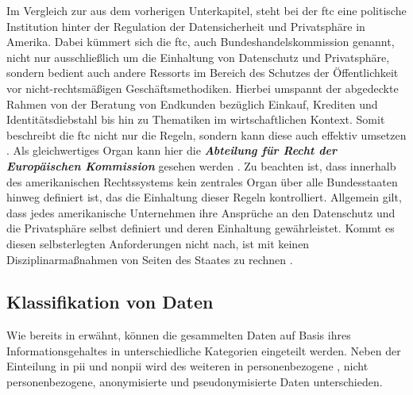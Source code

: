 Im Vergleich zur  aus dem vorherigen Unterkapitel, steht bei der \acl{ftc} eine politische Institution hinter der Regulation der Datensicherheit und Privatsphäre in Amerika. Dabei kümmert sich die \ac{ftc}, auch Bundeshandelskommission genannt, nicht nur ausschließlich um die Einhaltung von Datenschutz und Privatsphäre, sondern bedient auch andere Ressorts im Bereich des Schutzes der Öffentlichkeit vor nicht-rechtsmäßigen Geschäftsmethodiken. Hierbei umspannt der abgedeckte Rahmen von der Beratung von Endkunden bezüglich Einkauf, Krediten und Identitätsdiebstahl bis hin zu Thematiken im wirtschaftlichen Kontext. Somit beschreibt die \ac{ftc} nicht nur die Regeln, sondern kann diese auch effektiv umsetzen \cite{FTC}. Als gleichwertiges Organ kann hier die \textbf{\textit{Abteilung für Recht der Europäischen Kommission}} gesehen werden \cite{FTCEU}. Zu beachten ist, dass innerhalb des amerikanischen Rechtssystems kein zentrales Organ über alle Bundesstaaten hinweg definiert ist, das die Einhaltung dieser Regeln kontrolliert. Allgemein gilt, dass jedes amerikanische Unternehmen ihre Ansprüche an den Datenschutz und die Privatsphäre selbst definiert und deren Einhaltung gewährleistet. Kommt es diesen selbsterlegten Anforderungen nicht nach, ist mit keinen Disziplinarmaßnahmen von Seiten des Staates zu rechnen \cite{DatenschutzOrg2022}.

\subsection{Klassifikation von Daten}
\label{sec:Grundlagen:ssec:Klassifikation von Daten}

Wie bereits in  erwähnt, können die gesammelten Daten auf Basis ihres Informationsgehaltes in unterschiedliche Kategorien eingeteilt werden. Neben der Einteilung in \ac{pii} und \ac{nonpii} wird des weiteren in personenbezogene , nicht personenbezogene, anonymisierte und pseudonymisierte Daten unterschieden.

